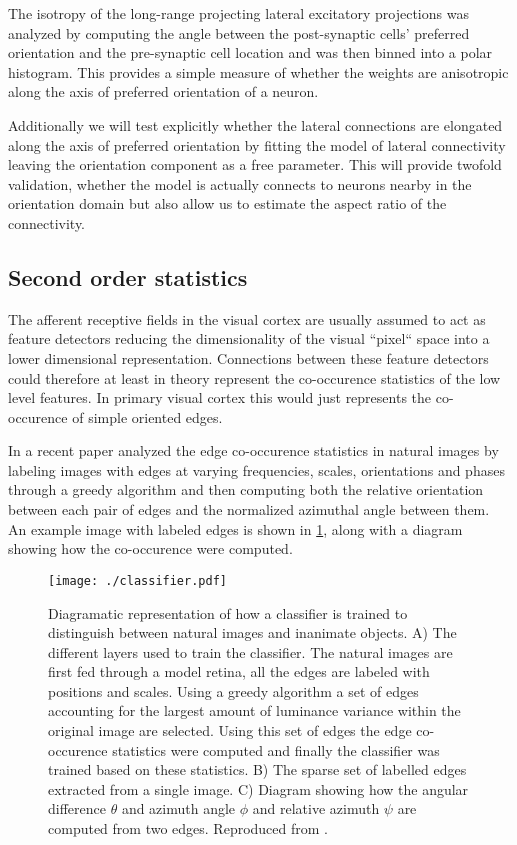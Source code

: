 The isotropy of the long-range projecting lateral excitatory
projections was analyzed by computing the angle between the
post-synaptic cells' preferred orientation and the pre-synaptic cell
location and was then binned into a polar histogram. This provides a
simple measure of whether the weights are anisotropic along the axis
of preferred orientation of a neuron.

Additionally we will test explicitly whether the lateral connections
are elongated along the axis of preferred orientation by fitting the
\cite{Buzas2006} model of lateral connectivity leaving the orientation
component as a free parameter. This will provide twofold validation,
whether the model is actually connects to neurons nearby in the
orientation domain but also allow us to estimate the aspect ratio of
the connectivity.

\subsection{Second order statistics}

The afferent receptive fields in the visual cortex are usually assumed
to act as feature detectors reducing the dimensionality of the visual
``pixel`` space into a lower dimensional representation. Connections
between these feature detectors could therefore at least in theory
represent the co-occurence statistics of the low level features. In
primary visual cortex this would just represents the co-occurence of
simple oriented edges.

In a recent paper \cite{Perrinet2015} analyzed the edge co-occurence
statistics in natural images by labeling images with edges at varying
frequencies, scales, orientations and phases through a greedy
algorithm and then computing both the relative orientation between
each pair of edges and the normalized azimuthal angle between them. An
example image with labeled edges is shown in \ref{classifier}, along
with a diagram showing how the co-occurence were computed.

\begin{figure}
	\centering
    \texttt{[image: ./classifier.pdf]}
	\caption[] {Diagramatic representation of how a classifier is
      trained to distinguish between natural images and inanimate
      objects. A) The different layers used to train the
      classifier. The natural images are first fed through a model
      retina, all the edges are labeled with positions and
      scales. Using a greedy algorithm a set of edges accounting for
      the largest amount of luminance variance within the original
      image are selected. Using this set of edges the edge
      co-occurence statistics were computed and finally the classifier
      was trained based on these statistics. B) The sparse set
      of labelled edges extracted from a single image. C) Diagram
      showing how the angular difference $\theta$ and azimuth angle
      $\phi$ and relative azimuth $\psi$ are computed from two
      edges. Reproduced from \cite{Perrinet2015}.}
	\label{classifier}
\end{figure}

